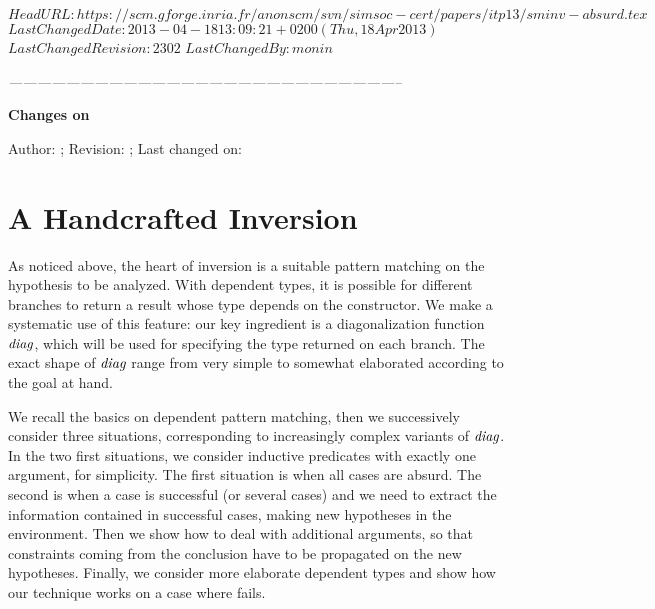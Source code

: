 \svnidlong
{$HeadURL: https://scm.gforge.inria.fr/anonscm/svn/simsoc-cert/papers/itp13/sminv-absurd.tex $}
{$LastChangedDate: 2013-04-18 13:09:21 +0200 (Thu, 18 Apr 2013) $}
{$LastChangedRevision: 2302 $}
{$LastChangedBy: monin $}


\begin{thoughts}
\itshape
\hfil -----------------------------------------------------------------------------------\par
\hfil \textbf{Changes on \currfilename}

Author: \svnfileauthor; Revision: \svnfilerev; Last changed on: \svnfiledate
\end{thoughts}


\section{A Handcrafted Inversion}
\label{sec:hci}

As noticed above, the heart of inversion is a suitable
pattern matching on the hypothesis to be analyzed.
With dependent types, it is possible for different branches
to return a result whose type depends on the constructor.
We make a systematic use of this feature:
our key ingredient is a diagonalization function $\textit{diag}$,
which will be used for specifying the type returned on each branch.
The exact shape of $\textit{diag}$ range from very simple to somewhat elaborated
according to the goal at hand. 

We recall the basics on dependent pattern matching,
then we successively consider three situations,
corresponding to increasingly complex variants of $\textit{diag}$.
In the two first situations, 
we consider inductive predicates with exactly one argument, for simplicity.
The first situation is when all cases are absurd.
The second is when a case is successful (or several cases)
and we need to extract the information contained in successful cases,
making new hypotheses in the environment.
Then we show how to deal with additional arguments,
so that constraints coming from the conclusion have to be propagated
on the new hypotheses.
Finally, we consider more elaborate dependent types
and show how our technique works on a case where \inversion fails.


